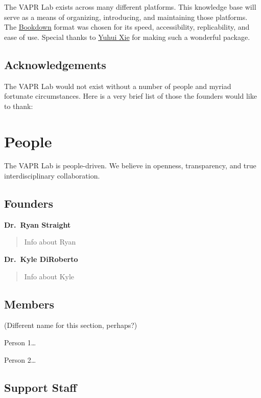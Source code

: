 \documentclass[12pt,]{memoir}
\begin{document}
The VAPR Lab exists across many different platforms. This knowledge base will serve as a means of organizing, introducing, and maintaining those platforms. The \href{https://bookdown.org}{Bookdown} format was chosen for its speed, accessibility, replicability, and ease of use. Special thanks to \href{https://yihui.name/}{Yuhui Xie} for making such a wonderful package.

\hypertarget{acknowledgements}{%
\section*{Acknowledgements}\label{acknowledgements}}

The VAPR Lab would not exist without a number of people and myriad fortunate circumstances. Here is a very brief list of those the founders would like to thank:

\hypertarget{people}{%
\chapter{People}\label{people}}

The VAPR Lab is people-driven. We believe in openness, transparency, and true interdisciplinary collaboration.

\hypertarget{founders}{%
\section{Founders}\label{founders}}

\textbf{Dr.~Ryan Straight}

\begin{quote}
Info about Ryan
\end{quote}

\textbf{Dr.~Kyle DiRoberto}

\begin{quote}
Info about Kyle
\end{quote}

\hypertarget{members}{%
\section{Members}\label{members}}

(Different name for this section, perhaps?)

Person 1\ldots{}

Person 2\ldots{}

\hypertarget{support-staff}{%
\section{Support Staff}\label{support-staff}}
\end{document}
